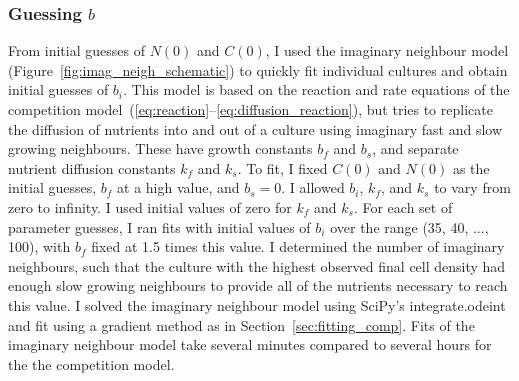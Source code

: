 


\subsubsection{\boldmath Guessing \(b\) \unboldmath}
\label{sec:guessing_b}


From initial guesses of \(N(0)\) and \(C(0)\), I used the imaginary
neighbour model (Figure~\ref{fig:imag_neigh_schematic}) to quickly fit
individual cultures and obtain initial guesses of \(b_{i}\). This
model is based on the reaction and rate equations of the competition
model~(\ref{eq:reaction}--\ref{eq:diffusion_reaction}), but tries to
replicate the diffusion of nutrients into and out of a culture using
imaginary fast and slow growing neighbours. These have growth
constants \(b_{f}\) and \(b_{s}\), and separate nutrient diffusion
constants \(k_{f}\) and \(k_{s}\).  To fit, I fixed \(C(0)\) and
\(N(0)\) as the initial guesses, \(b_{f}\) at a high value, and
\(b_{s} = 0\). I allowed \(b_{i}\), \(k_{f}\), and \(k_{s}\) to vary
from zero to infinity. I used initial values of zero for \(k_{f}\) and
\(k_{s}\). For each set of parameter guesses, I ran fits with initial
values of \(b_{i}\) over the range (35, 40, ..., 100), with \(b_{f}\)
fixed at 1.5 times this value. I determined the number of imaginary
neighbours, such that the culture with the highest observed final cell
density had enough slow growing neighbours to provide all of the
nutrients necessary to reach this value. I solved the imaginary
neighbour model using SciPy's integrate.odeint and fit using a
gradient method as in Section~\ref{sec:fitting_comp}. Fits of the
imaginary neighbour model take several minutes compared to several
hours for the
the competition model.

